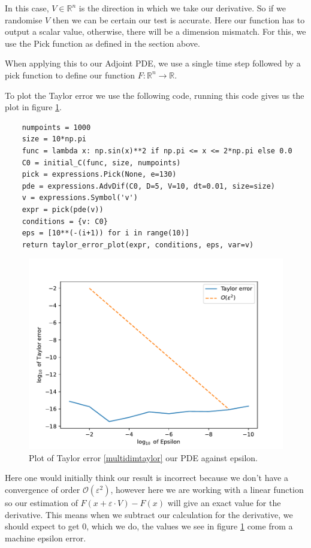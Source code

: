\documentclass{article}
\begin{document}
In this case, $V \in \mathbb{R}^n$ is the direction in which we take our derivative. So if we randomise $V$ then we can be certain our test is accurate. Here our function has to output a scalar value, otherwise, there will be a dimension mismatch. For this, we use the Pick function as defined in the section above.

When applying this to our Adjoint PDE, we use a single time step followed by a pick function to define our function $F: \mathbb{R}^n \rightarrow \mathbb{R}$.

To plot the Taylor error we use the following code, running this code \cite{github} gives us the plot in figure \ref{fig:ODE}.



\begin{verbatim}
    numpoints = 1000
    size = 10*np.pi
    func = lambda x: np.sin(x)**2 if np.pi <= x <= 2*np.pi else 0.0
    C0 = initial_C(func, size, numpoints)
    pick = expressions.Pick(None, e=130)
    pde = expressions.AdvDif(C0, D=5, V=10, dt=0.01, size=size)
    v = expressions.Symbol('v')
    expr = pick(pde(v))
    conditions = {v: C0}
    eps = [10**(-(i+1)) for i in range(10)]
    return taylor_error_plot(expr, conditions, eps, var=v)
\end{verbatim}

\begin{figure}[h!]
    \centering
    \includegraphics[width=12cm]{images/Graph_PDE_Taylor.pdf}
    \caption{Plot of Taylor error \ref{multidimtaylor} our PDE against epsilon.}
    \label{fig:ODE}
\end{figure}



Here one would initially think our result is incorrect because we don't have a convergence of order $\mathcal{O}(\varepsilon^2)$, however here we are working with a linear function so our estimation of $F(x + \varepsilon \cdot V) - F(x)$ will give an exact value for the derivative. This means when we subtract our calculation for the derivative, we should expect to get 0, which we do, the values we see in figure \ref{fig:ODE} come from a machine epsilon error.
\end{document}
